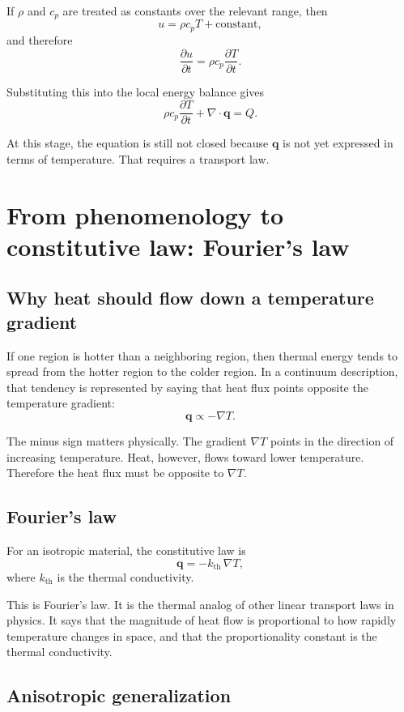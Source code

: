\documentclass[11pt]{article}
\newcommand{\qvec}{\mathbf{q}}
\newcommand{\kth}{k_{\mathrm{th}}}
\begin{document}
If $\rho$ and $c_p$ are treated as constants over the relevant range, then
\[
u = \rho c_p T + \text{constant},
\]
and therefore
\[
\frac{\partial u}{\partial t} = \rho c_p \frac{\partial T}{\partial t}.
\]

Substituting this into the local energy balance gives
\[
\rho c_p \frac{\partial T}{\partial t} + \nabla \cdot \qvec = Q.
\]

At this stage, the equation is still not closed because $\qvec$ is not yet expressed in terms of temperature. That requires a transport law.

\section{From phenomenology to constitutive law: Fourier's law}

\subsection{Why heat should flow down a temperature gradient}

If one region is hotter than a neighboring region, then thermal energy tends to spread from the hotter region to the colder region. In a continuum description, that tendency is represented by saying that heat flux points opposite the temperature gradient:
\[
\qvec \propto -\nabla T.
\]

The minus sign matters physically. The gradient $\nabla T$ points in the direction of increasing temperature. Heat, however, flows toward lower temperature. Therefore the heat flux must be opposite to $\nabla T$.

\subsection{Fourier's law}

For an isotropic material, the constitutive law is
\[
\qvec = -\kth \, \nabla T,
\]
where $\kth$ is the thermal conductivity.

This is Fourier's law. It is the thermal analog of other linear transport laws in physics. It says that the magnitude of heat flow is proportional to how rapidly temperature changes in space, and that the proportionality constant is the thermal conductivity.

\subsection{Anisotropic generalization}
\end{document}
